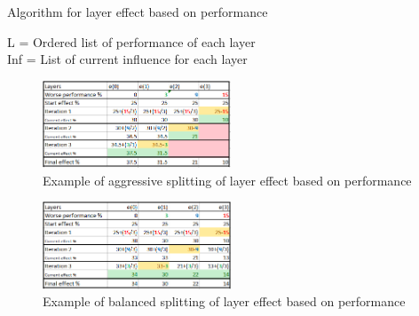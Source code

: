 \begin{algorithm}
    \caption{Algorithm for layer effect based on performance}
    \SetAlgoLined
     L = Ordered list of performance of each layer \\
     Inf = List of current influence for each layer \\
     \label{alg:layereffect}
    \end{algorithm}

\begin{figure}
    \includegraphics[width=0.5\textwidth]{figures/fredsplit/aggresiveAlgo.png}
    \centering
    \caption{Example of aggressive splitting of layer effect based on performance}
    \label{fig:fredsplitAgg}
\end{figure}
\begin{figure}
    \includegraphics[width=0.5\textwidth]{figures/fredsplit/balancedAlgo.png}
    \centering
    \caption{Example of balanced splitting of layer effect based on performance}
    \label{fig:fredsplitBal}
\end{figure}
